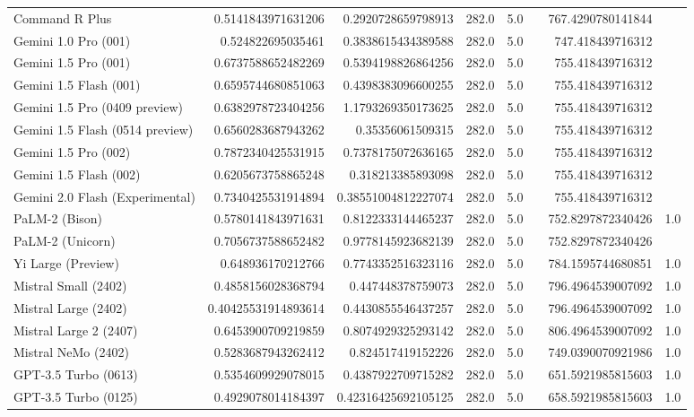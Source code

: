 \begin{table}[htp]
{\begin{tabular}{lrrrrrrr}
Command R Plus & 0.5141843971631206 & 0.2920728659798913 & 282.0 & 5.0 &  & 767.4290780141844 &  \\
Gemini 1.0 Pro (001) & 0.524822695035461 & 0.3838615434389588 & 282.0 & 5.0 &  & 747.418439716312 &  \\
Gemini 1.5 Pro (001) & 0.6737588652482269 & 0.5394198826864256 & 282.0 & 5.0 &  & 755.418439716312 &  \\
Gemini 1.5 Flash (001) & 0.6595744680851063 & 0.4398383096600255 & 282.0 & 5.0 &  & 755.418439716312 &  \\
Gemini 1.5 Pro (0409 preview) & 0.6382978723404256 & 1.1793269350173625 & 282.0 & 5.0 &  & 755.418439716312 &  \\
Gemini 1.5 Flash (0514 preview) & 0.6560283687943262 & 0.35356061509315 & 282.0 & 5.0 &  & 755.418439716312 &  \\
Gemini 1.5 Pro (002) & 0.7872340425531915 & 0.7378175072636165 & 282.0 & 5.0 &  & 755.418439716312 &  \\
Gemini 1.5 Flash (002) & 0.6205673758865248 & 0.318213385893098 & 282.0 & 5.0 &  & 755.418439716312 &  \\
Gemini 2.0 Flash (Experimental) & 0.7340425531914894 & 0.38551004812227074 & 282.0 & 5.0 &  & 755.418439716312 &  \\
PaLM-2 (Bison) & 0.5780141843971631 & 0.8122333144465237 & 282.0 & 5.0 &  & 752.8297872340426 & 1.0 \\
PaLM-2 (Unicorn) & 0.7056737588652482 & 0.9778145923682139 & 282.0 & 5.0 &  & 752.8297872340426 &  \\
Yi Large (Preview) & 0.648936170212766 & 0.7743352516323116 & 282.0 & 5.0 &  & 784.1595744680851 & 1.0 \\
Mistral Small (2402) & 0.4858156028368794 & 0.447448378759073 & 282.0 & 5.0 &  & 796.4964539007092 & 1.0 \\
Mistral Large (2402) & 0.40425531914893614 & 0.4430855546437257 & 282.0 & 5.0 &  & 796.4964539007092 & 1.0 \\
Mistral Large 2 (2407) & 0.6453900709219859 & 0.8074929325293142 & 282.0 & 5.0 &  & 806.4964539007092 & 1.0 \\
Mistral NeMo (2402) & 0.5283687943262412 & 0.824517419152226 & 282.0 & 5.0 &  & 749.0390070921986 & 1.0 \\
GPT-3.5 Turbo (0613) & 0.5354609929078015 & 0.4387922709715282 & 282.0 & 5.0 &  & 651.5921985815603 & 1.0 \\
GPT-3.5 Turbo (0125) & 0.4929078014184397 & 0.42316425692105125 & 282.0 & 5.0 &  & 658.5921985815603 & 1.0 \\

\end{tabular}}
\end{table}
